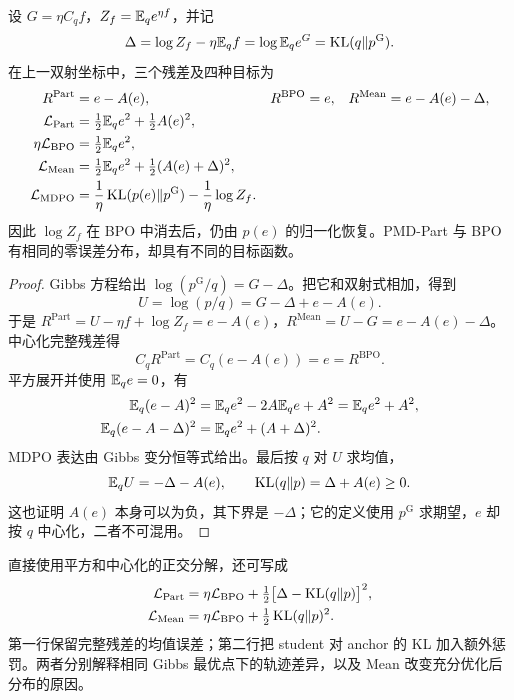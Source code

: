 \begin{theorem}[四种目标在同一坐标中的精确表达]
\label{thm:quotient-losses}
设 $G=\eta C_qf$，$Z_f=\mathbb E_qe^{\eta f}$，并记
\begin{equation}
\Delta=\log Z_f-\eta\mathbb E_q f
=\log\mathbb E_q e^G=\operatorname{KL}(q\Vert p^{\mathrm G}).
\end{equation}
在上一双射坐标中，三个残差及四种目标为
\begin{align}
R^{\mathrm{Part}}&=e-A(e),&
R^{\mathrm{BPO}}&=e,&
R^{\mathrm{Mean}}&=e-A(e)-\Delta,\\
\mathcal L_{\mathrm{Part}}&=\tfrac12\mathbb E_qe^2+\tfrac12A(e)^2,\\
\eta\mathcal L_{\mathrm{BPO}}&=\tfrac12\mathbb E_qe^2,\\
\mathcal L_{\mathrm{Mean}}&=\tfrac12\mathbb E_qe^2+\tfrac12(A(e)+\Delta)^2,\\
\mathcal L_{\mathrm{MDPO}}&=\frac1\eta\operatorname{KL}(p(e)\Vert p^{\mathrm G})-\frac1\eta\log Z_f.
\label{eq:quotient-four-losses}
\end{align}
因此 $\log Z_f$ 在 BPO 中消去后，仍由 $p(e)$ 的归一化恢复。PMD-Part 与 BPO 有相同的零误差分布，却具有不同的目标函数。
\end{theorem}
\begin{proof}
Gibbs 方程给出 $\log(p^{\mathrm G}/q)=G-\Delta$。把它和双射式相加，得到
\begin{equation}
U=\log(p/q)=G-\Delta+e-A(e).
\end{equation}
于是 $R^{\mathrm{Part}}=U-\eta f+\log Z_f=e-A(e)$，$R^{\mathrm{Mean}}=U-G=e-A(e)-\Delta$。中心化完整残差得
\begin{equation}
C_qR^{\mathrm{Part}}=C_q(e-A(e))=e=R^{\mathrm{BPO}}.
\end{equation}
平方展开并使用 $\mathbb E_qe=0$，有
\begin{align}
\mathbb E_q(e-A)^2&=\mathbb E_qe^2-2A\mathbb E_qe+A^2=\mathbb E_qe^2+A^2,\\
\mathbb E_q(e-A-\Delta)^2&=\mathbb E_qe^2+(A+\Delta)^2.
\end{align}
MDPO 表达由 Gibbs 变分恒等式给出。最后按 $q$ 对 $U$ 求均值，
\begin{equation}
\mathbb E_qU=-\Delta-A(e),\qquad \operatorname{KL}(q\Vert p)=\Delta+A(e)\ge0.
\end{equation}
这也证明 $A(e)$ 本身可以为负，其下界是 $-\Delta$；它的定义使用 $p^{\mathrm G}$ 求期望，$e$ 却按 $q$ 中心化，二者不可混用。
\end{proof}

直接使用平方和中心化的正交分解，还可写成
\begin{align}
\mathcal L_{\mathrm{Part}}&=\eta\mathcal L_{\mathrm{BPO}}
+\tfrac12\bigl[\Delta-\operatorname{KL}(q\Vert p)\bigr]^2,\\
\mathcal L_{\mathrm{Mean}}&=\eta\mathcal L_{\mathrm{BPO}}
+\tfrac12\operatorname{KL}(q\Vert p)^2.
\label{eq:quotient-penalties}
\end{align}
第一行保留完整残差的均值误差；第二行把 student 对 anchor 的 KL 加入额外惩罚。两者分别解释相同 Gibbs 最优点下的轨迹差异，以及 Mean 改变充分优化后分布的原因。

